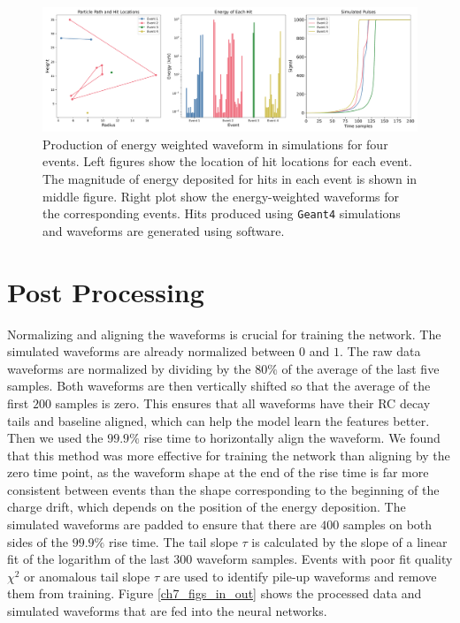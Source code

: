 \begin{figure}[htb!]
    \includegraphics[width=0.99\linewidth,trim={1pc 0pc 1pc 0pc},clip]{ch7/figs/hit_sims.pdf}
    \caption{Production of energy weighted waveform in simulations for four events. Left figures show the location of hit locations for each event.  The magnitude of energy deposited for hits in each event is shown in middle figure. Right plot show the energy-weighted waveforms for the corresponding events. Hits produced using \texttt{Geant4} simulations and waveforms are generated using {\siggen} software.}
   \label{ch7_fig_eng_dep_sim}
\end{figure}

\section{Post Processing}
Normalizing and aligning the waveforms is crucial for training the network. The simulated waveforms are already normalized between $0$ and $1$. The raw data waveforms are normalized by dividing by the $80\%$ of the average of the last five samples. Both waveforms are then vertically shifted so that the average of the first $200$ samples is zero. This ensures that all waveforms have their RC decay tails and baseline aligned, which can help the model learn the features better. Then we used the $99.9\%$ rise time to horizontally align the waveform. We found that this method was more effective for training the network than aligning by the zero time point, as the waveform shape at the end of the rise time is far more consistent between events than the shape corresponding to the beginning of the charge drift, which depends on the position of the energy deposition. The simulated waveforms are padded to ensure that there are $400$ samples on both sides of the $99.9\%$ rise time. The tail slope $\tau$ is calculated by the slope of a linear fit of the logarithm of the last $300$ waveform samples. Events with poor fit quality $\chi^2$ or anomalous tail slope $\tau$ are used to identify pile-up waveforms and remove them from training. Figure \ref{ch7_figs_in_out} shows the processed data and simulated waveforms that are fed into the neural networks.

